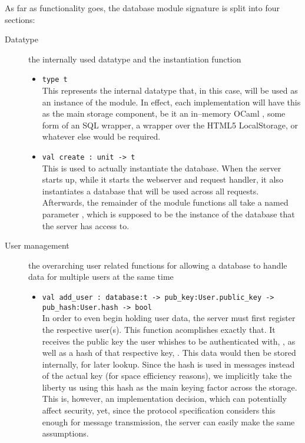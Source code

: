 As far as functionality goes, the database module signature is split into four sections:
\begin{description}
  \item[Datatype] the internally used datatype and the instantiation function
  \begin{itemize}
    \item \verb|type t| \\
    This represents the internal datatype that, in this case, will be used as an instance of the module.
    In effect, each implementation will have this as the main storage component, be it an in--memory OCaml , some form of an SQL wrapper, a wrapper over the HTML5 LocalStorage, or whatever else would be required.
    \item \verb|val create : unit -> t| \\
    This is used to actually instantiate the database.
    When the server starts up, while it starts the webserver and request handler, it also instantiates a database that will be used across all requests.
    Afterwards, the remainder of the module functions all take a named parameter , which is supposed to be the instance of the database that the server has access to.
  \end{itemize}

  \item[User management] the overarching user related functions for allowing a database to handle data for multiple users at the same time
  \begin{itemize}
  \item \verb|val add_user : database:t -> pub_key:User.public_key -> pub_hash:User.hash -> bool| \\
  In order to even begin holding user data, the server must first register the respective user(s).
  This function acomplishes exactly that.
  It receives the public key the user whishes to be authenticated with, , as well as a hash of that respective key, .
  This data would then be stored internally, for later lookup.
  Since the hash is used in messages instead of the actual key (for space efficiency reasons), we implicitly take the liberty us using this hash as the main keying factor across the storage.
  This is, however, an implementation decision, which can potentially affect security, yet, since the protocol specification considers this enough for message transmission, the server can easily make the same assumptions.


\end{itemize}
\end{description}
